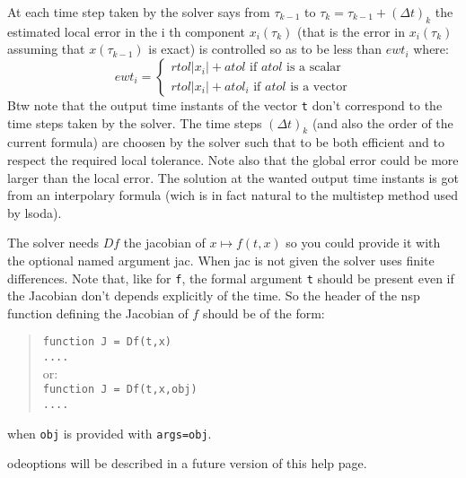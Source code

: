 \begin{mandescription}
At each time step taken by the solver says from $\tau_{k-1}$ to  $\tau_k = \tau_{k-1} + (\Delta t)_k$
the estimated local error in the i th component $x_i(\tau_k)$ (that is the error in 
$x_i(\tau_k)$ assuming that $x(\tau_{k-1})$ is exact) is controlled so as to be less 
than $ewt_i$ where:
$$
ewt_i =
\left\{
\begin{array}{l}
 rtol | x_i | + atol  \mbox{ if } atol \mbox { is a scalar} \\
 rtol | x_i | + atol_i  \mbox{ if } atol \mbox { is a vector}
\end{array}
\right.
$$
 Btw note that the output time instants  of the vector \verb+t+ don't correspond 
to the time steps taken by the solver. The  time steps $(\Delta t)_k$
(and also the order of the current formula) are choosen by the solver such 
that to be both efficient and to respect the required local tolerance. Note 
also that the global error could be more larger than the local error. The 
solution at the wanted output time instants is got from an interpolary 
formula (wich is in fact natural to the multistep method used by lsoda).


The solver needs $Df$ the jacobian of $x \mapsto f(t,x)$ so you could provide it with the optional named argument 
jac. When jac is not given the solver uses finite differences. Note that, like for \verb+f+, the formal argument
\verb+t+ should be present even if the Jacobian don't depends explicitly of the time. So the header of the nsp 
function defining the Jacobian of $f$ should be of the form:
\begin{quote}
{\tt function J = Df(t,x) \\
      ....}\\
or:\\
{\tt function J = Df(t,x,obj) \\
     ....}
\end{quote}
when {\tt obj} is provided with {\tt args=obj}.


odeoptions will be described in a future version of this help page.

\end{mandescription} 

